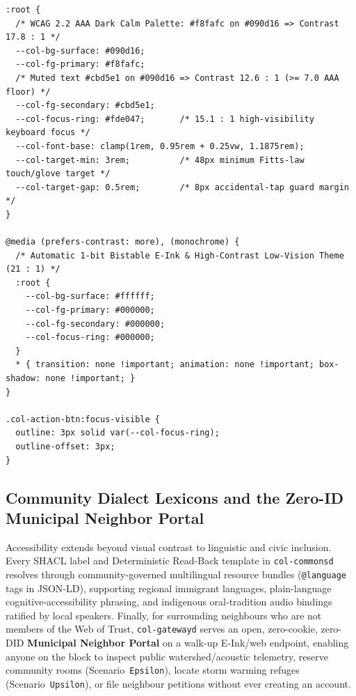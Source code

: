 \begin{lstlisting}[caption={Ratified v3.1 WCAG 2.2 AAA and E-Ink / Print adaptive design tokens replacing sub-10px HUD styles.}]
:root {
  /* WCAG 2.2 AAA Dark Calm Palette: #f8fafc on #090d16 => Contrast 17.8 : 1 */
  --col-bg-surface: #090d16;
  --col-fg-primary: #f8fafc;
  /* Muted text #cbd5e1 on #090d16 => Contrast 12.6 : 1 (>= 7.0 AAA floor) */
  --col-fg-secondary: #cbd5e1;
  --col-focus-ring: #fde047;       /* 15.1 : 1 high-visibility keyboard focus */
  --col-font-base: clamp(1rem, 0.95rem + 0.25vw, 1.1875rem);
  --col-target-min: 3rem;          /* 48px minimum Fitts-law touch/glove target */
  --col-target-gap: 0.5rem;        /* 8px accidental-tap guard margin */
}

@media (prefers-contrast: more), (monochrome) {
  /* Automatic 1-bit Bistable E-Ink & High-Contrast Low-Vision Theme (21 : 1) */
  :root {
    --col-bg-surface: #ffffff;
    --col-fg-primary: #000000;
    --col-fg-secondary: #000000;
    --col-focus-ring: #000000;
  }
  * { transition: none !important; animation: none !important; box-shadow: none !important; }
}

.col-action-btn:focus-visible {
  outline: 3px solid var(--col-focus-ring);
  outline-offset: 3px;
}
\end{lstlisting}

\subsection{Community Dialect Lexicons and the Zero-ID Municipal Neighbor Portal}

Accessibility extends beyond visual contrast to linguistic and civic inclusion. Every SHACL label and Deterministic Read-Back template in \texttt{col-commonsd} resolves through community-governed multilingual resource bundles (\texttt{@language} tags in JSON-LD), supporting regional immigrant languages, plain-language cognitive-accessibility phrasing, and indigenous oral-tradition audio bindings ratified by local speakers. Finally, for surrounding neighbours who are not members of the Web of Trust, \texttt{col-gatewayd} serves an open, zero-cookie, zero-DID \textbf{Municipal Neighbor Portal} on a walk-up E-Ink/web endpoint, enabling anyone on the block to inspect public watershed/acoustic telemetry, reserve community rooms (Scenario~\texttt{Epsilon}), locate storm warming refuges (Scenario~\texttt{Upsilon}), or file neighbour petitions without ever creating an account.

